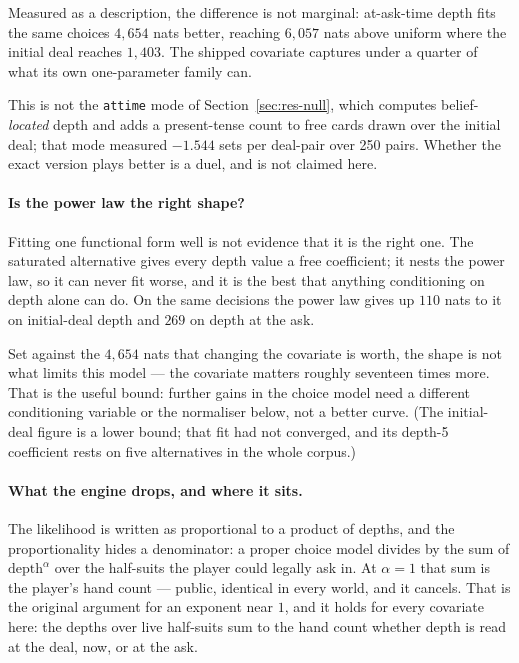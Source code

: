 \documentclass[11pt,a4paper]{article}
\begin{document}
Measured as a description, the difference is not marginal: at-ask-time depth
fits the same choices $4{,}654$ nats better, reaching $6{,}057$ nats above
uniform where the initial deal reaches $1{,}403$. The shipped covariate captures
under a quarter of what its own one-parameter family can.

This is not the \texttt{attime} mode of Section~\ref{sec:res-null}, which
computes belief-\emph{located} depth and adds a present-tense count to free cards
drawn over the initial deal; that mode measured $-1.544$ sets per deal-pair over
250 pairs. Whether the exact version plays better is a duel, and is not claimed
here.

\paragraph{Is the power law the right shape?} Fitting one functional form well
is not evidence that it is the right one. The saturated alternative gives every
depth value a free coefficient; it nests the power law, so it can never fit
worse, and it is the best that anything conditioning on depth alone can do. On
the same decisions the power law gives up $110$ nats to it on initial-deal depth
and $269$ on depth at the ask.

Set against the $4{,}654$ nats that changing the covariate is worth, the shape is
not what limits this model --- the covariate matters roughly seventeen times
more. That is the useful bound: further gains in the choice model need a
different conditioning variable or the normaliser below, not a better curve.
(The initial-deal figure is a lower bound; that fit had not converged, and its
depth-5 coefficient rests on five alternatives in the whole corpus.)

\paragraph{What the engine drops, and where it sits.} The likelihood is written
as proportional to a product of depths, and the proportionality hides a
denominator: a proper choice model divides by the sum of $\text{depth}^\alpha$
over the half-suits the player could legally ask in. At $\alpha = 1$ that sum is
the player's hand count --- public, identical in every world, and it cancels.
That is the original argument for an exponent near $1$, and it holds for every
covariate here: the depths over live half-suits sum to the hand count whether
depth is read at the deal, now, or at the ask.
\end{document}
